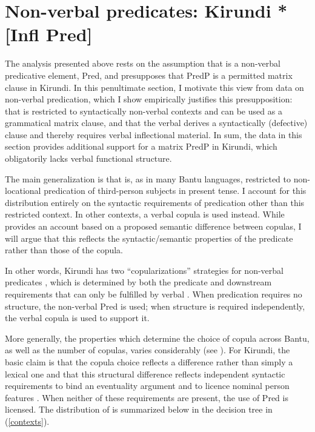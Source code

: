 \documentclass[12pt]{article}
\begin{document}
\section{Non-verbal predicates: Kirundi *[Infl Pred]} \label{sec:copula}



The analysis presented above rests on the assumption that  is a non-verbal predicative element, Pred, and presupposes that PredP is a permitted matrix clause in Kirundi. In this penultimate section, I motivate this view from data on non-verbal predication, which I show empirically justifies this presupposition:  that  is restricted to syntactically non-verbal contexts and can be used as a grammatical matrix clause, and that the verbal  derives a syntactically (defective)  clause and thereby requires verbal inflectional material. In sum, the data in this section provides additional support for a matrix PredP in Kirundi, which obligatorily lacks verbal functional structure. 

The main generalization is that  is, as in many Bantu languages, restricted to non-locational predication of third-person subjects in present tense. I account for this distribution entirely on the syntactic requirements of predication other than this restricted context. In other contexts, a verbal copula  is used instead. While \citet{jerro-2013} provides an account based on a proposed semantic difference between copulas, I will argue that this reflects the syntactic/semantic properties of the predicate rather than those of the copula.  

In other words, Kirundi has two ``copularizations'' strategies  for non-verbal predicates \citep{pustet-2003}, which is determined by both the predicate and downstream requirements that can only be fulfilled by verbal . When predication requires no  structure, the non-verbal Pred  is used; when  structure is required independently, the verbal copula  is used to support it.

More generally, the properties which determine the choice of copula across Bantu, as well as the number of copulas, varies considerably (see \citealt{gibson-et-al-2019,gluckman-2022}). For Kirundi, the basic claim is that the copula choice reflects a  difference rather than simply a lexical one and that this structural difference reflects independent syntactic requirements to bind an eventuality argument \citep{adger-ramchand-2003,welch-2012} and to licence nominal person features \citep{bejar-rezac-2003}. When neither of these requirements are present, the use of Pred  is licensed. The distribution of  is summarized below in the decision tree in (\ref{contexts}).
\end{document}
